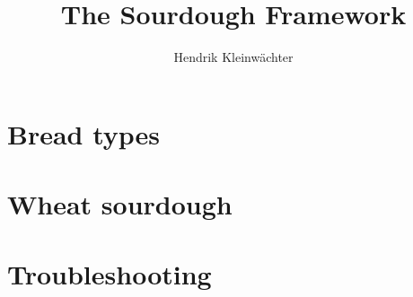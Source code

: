 \documentclass[paper=a4, twoside=false, fontsize=12pt, parskip=half,
                bibliography=totoc, listof=totoc]{scrbook}
\author{Hendrik Kleinwächter}
\title{The Sourdough Framework}
\begin{document}

\titlepage

\frontmatter
{%
\hypersetup{hidelinks}
\ifdefined\HCode\else\tableofcontents\fi
}





\mainmatter











\chapter{Bread types}


\chapter{Wheat sourdough}%
\label{chapter:wheat-sourdough}




% 




\chapter{Troubleshooting}


\backmatter

\printbibliography
{%
\hypersetup{hidelinks}
\listofflowcharts
\listoftables
\listoffigures
}
\end{document}
